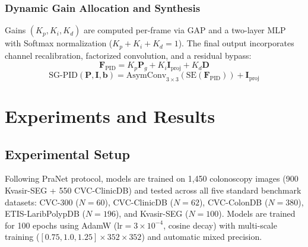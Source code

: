 \documentclass[conference]{IEEEtran}
\begin{document}
\subsubsection{Dynamic Gain Allocation and Synthesis}
Gains $(K_p, K_i, K_d)$ are computed per-frame via GAP and a two-layer MLP with Softmax normalization ($K_p+K_i+K_d=1$). The final output incorporates channel recalibration, factorized convolution, and a residual bypass:
\begin{equation}
\mathbf{F}_{\text{PID}} = K_p \mathbf{P}_g + K_i \mathbf{I}_{\text{proj}} + K_d \mathbf{D}
\end{equation}
\begin{equation}
\text{SG-PID}(\mathbf{P}, \mathbf{I}, \mathbf{b}) = \text{AsymConv}_{3\times3}\left(\text{SE}(\mathbf{F}_{\text{PID}})\right) + \mathbf{I}_{\text{proj}}
\end{equation}

\section{Experiments and Results}

\subsection{Experimental Setup}
Following PraNet protocol, models are trained on 1,450 colonoscopy images (900 Kvasir-SEG + 550 CVC-ClinicDB) and tested across all five standard benchmark datasets: CVC-300 ($N=60$), CVC-ClinicDB ($N=62$), CVC-ColonDB ($N=380$), ETIS-LaribPolypDB ($N=196$), and Kvasir-SEG ($N=100$). Models are trained for 100 epochs using AdamW ($\text{lr}=3\times10^{-4}$, cosine decay) with multi-scale training ($[0.75, 1.0, 1.25]\times 352\times352$) and automatic mixed precision.
\end{document}
